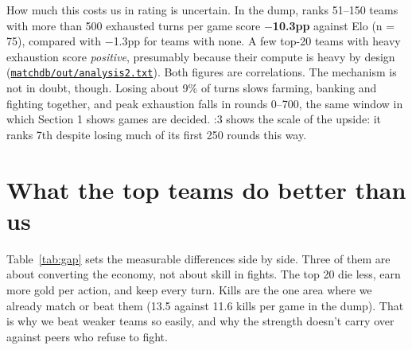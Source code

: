 \documentclass[11pt,a4paper]{article}
\newcommand{\scratch}{file:///private/tmp/claude-501/-Users-tristanbasri-Desktop-Code-cambridge-battlecode-s2/b3f4cb6b-e46a-405f-957c-42c44c05c8dc/scratchpad/ladder-data}
\newcommand{\src}[2]{{\small(\href{#1}{\textcolor{cTop}{\texttt{#2}}})}}
\begin{document}
How much this costs us in rating is uncertain. In the dump, ranks 51--150 teams with more than 500 exhausted turns per game score \textbf{$-$10.3pp} against Elo (n = 75), compared with $-$1.3pp for teams with none. A few top-20 teams with heavy exhaustion score \emph{positive}, presumably because their compute is heavy by design \src{\scratch/matchdb/out/analysis2.txt}{matchdb/out/analysis2.txt}. Both figures are correlations. The mechanism is not in doubt, though. Losing about 9\% of turns slows farming, banking and fighting together, and peak exhaustion falls in rounds 0--700, the same window in which Section 1 shows games are decided. :3 shows the scale of the upside: it ranks 7th despite losing much of its first 250 rounds this way.

\section{What the top teams do better than us}

Table~\ref{tab:gap} sets the measurable differences side by side. Three of them are about converting the economy, not about skill in fights. The top 20 die less, earn more gold per action, and keep every turn. Kills are the one area where we already match or beat them (13.5 against 11.6 kills per game in the dump). That is why we beat weaker teams so easily, and why the strength doesn't carry over against peers who refuse to fight.
\end{document}

